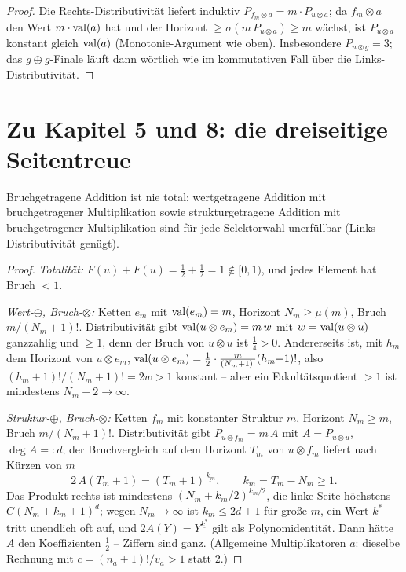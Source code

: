 \begin{proof}
Die Rechts-Distributivität liefert induktiv
$P_{f_m\otimes a}=m\cdot P_{u\otimes a}$; da $f_m\otimes a$ den
Wert $m\cdot\operatorname{val}(a)$ hat und der Horizont
$\ge\sigma(m\,P_{u\otimes a})\ge m$ wächst, ist $P_{u\otimes a}$
konstant gleich $\operatorname{val}(a)$ (Monotonie-Argument wie oben).
Insbesondere $P_{u\otimes g}=3$; das $g\oplus g$-Finale läuft dann
wörtlich wie im kommutativen Fall über die Links-Distributivität.
\end{proof}

\section*{Zu Kapitel 5 und 8: die dreiseitige Seitentreue}

\begin{satz}[Trilogie]
Bruchgetragene Addition ist nie total; wertgetragene Addition mit
bruchgetragener Multiplikation sowie strukturgetragene Addition mit
bruchgetragener Multiplikation sind für jede Selektorwahl
unerfüllbar (Links-Distributivität genügt).
\end{satz}

\begin{proof}
\emph{Totalität:} $F(u)+F(u)=\tfrac12+\tfrac12=1\notin[0,1)$, und
jedes Element hat Bruch $<1$.

\emph{Wert-$\oplus$, Bruch-$\otimes$:} Ketten $e_m$ mit
$\operatorname{val}(e_m)=m$, Horizont $N_m\ge\mu(m)$, Bruch $m/(N_m{+}1)!$.
Distributivität gibt $\operatorname{val}(u\otimes e_m)=m\,w$ mit
$w=\operatorname{val}(u\otimes u)$ -- ganzzahlig und $\ge1$, denn der Bruch von
$u\otimes u$ ist $\tfrac14>0$. Andererseits ist, mit $h_m$ dem
Horizont von $u\otimes e_m$,
$\operatorname{val}(u\otimes e_m)=\tfrac12\cdot\frac{m}{(N_m+1)!}(h_m{+}1)!$,
also $(h_m{+}1)!/(N_m{+}1)!=2w>1$ konstant -- aber ein
Fakultätsquotient $>1$ ist mindestens $N_m{+}2\to\infty$.

\emph{Struktur-$\oplus$, Bruch-$\otimes$:} Ketten $f_m$ mit
konstanter Struktur $m$, Horizont $N_m\ge m$, Bruch
$m/(N_m{+}1)!$. Distributivität gibt $P_{u\otimes f_m}=m\,A$ mit
$A=P_{u\otimes u}$, $\deg A=:d$; der Bruchvergleich auf dem
Horizont $T_m$ von $u\otimes f_m$ liefert nach Kürzen von $m$
\[
2\,A(T_m{+}1)=(T_m{+}1)^{\underline{\,k_m}},\qquad
k_m=T_m-N_m\ge1 .
\]
Das Produkt rechts ist mindestens $(N_m+k_m/2)^{k_m/2}$, die linke
Seite höchstens $C(N_m{+}k_m{+}1)^d$; wegen $N_m\to\infty$ ist
$k_m\le2d{+}1$ für große $m$, ein Wert $k^*$ tritt unendlich oft
auf, und $2A(Y)=Y^{\underline{k^*}}$ gilt als Polynomidentität.
Dann hätte $A$ den Koeffizienten $\tfrac12$ -- Ziffern sind ganz.
(Allgemeine Multiplikatoren $a$: dieselbe Rechnung mit
$c=(n_a{+}1)!/v_a>1$ statt $2$.)
\end{proof}

